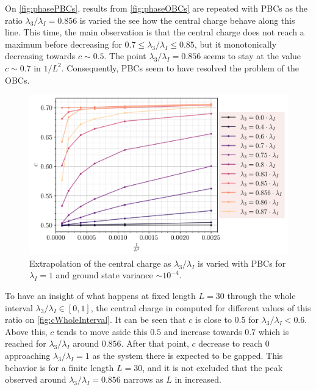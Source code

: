 	On \autoref{fig:phasePBCs}, results from \autoref{fig:phaseOBCs} are repeated with PBCs as the ratio $\lambda_3/\lambda_I=0.856$ is varied the see how the central charge behave along this line. This time, the main observation is that the central charge does not reach a maximum before decreasing for $0.7\leq\lambda_3/\lambda_I\leq0.85$, but it monotonically decreasing towards $c\sim 0.5$. The point $\lambda_3/\lambda_I=0.856$ seems to stay at the value $c \sim 0.7$ in $1/L^2$. Consequently, PBCs seem to have resolved the problem of the OBCs.

	\begin{figure}[h!]
		\centering
		\includegraphics[scale=0.66]{../graphs/phase/pbc/J=1.0_h=1.0_i=1.0_c=0.0.png}
		\caption{Extrapolation of the central charge as $\lambda_3/\lambda_I$ is varied with PBCs for $\lambda_I=1$ and ground state variance $\sim 10^{-4}$.}
		\label{fig:phasePBCs}
	\end{figure}

	To have an insight of what happens at fixed length $L=30$ through the whole interval $\lambda_3/\lambda_I \in [0, 1]$, the central charge in computed for different values of this ratio on \autoref{fig:cWholeInterval}. It can be seen that $c$ is close to $0.5$ for $\lambda_3/\lambda_I<0.6$. Above this, $c$ tends to move aside this $0.5$ and increase towards $0.7$ which is reached for $\lambda_3/\lambda_I$ around $0.856$. After that point, $c$ decrease to reach $0$ approaching $\lambda_3/\lambda_I=1$ as the system there is expected to be gapped. This behavior is for a finite length $L=30$, and it is not excluded that the peak observed around $\lambda_3/\lambda_I=0.856$ narrows as $L$ in increased.


